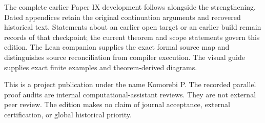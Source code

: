The complete earlier Paper IX development follows alongside the strengthening. Dated appendices retain the original continuation arguments and recovered historical text. Statements about an earlier open target or an earlier build remain records of that checkpoint; the current theorem and scope statements govern this edition. The Lean companion supplies the exact formal source map and distinguishes source reconciliation from compiler execution. The visual guide supplies exact finite examples and theorem-derived diagrams.

This is a project publication under the name Komorebi P. The recorded parallel proof audits are internal computational-assistant reviews. They are not external peer review. The edition makes no claim of journal acceptance, external certification, or global historical priority.
\clearpage
